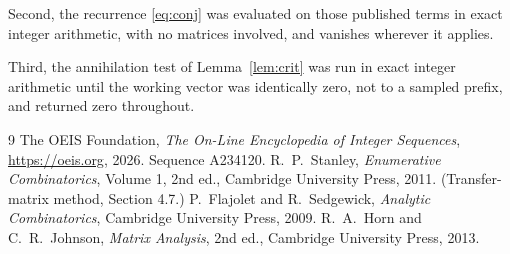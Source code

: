 \documentclass[11pt,a4paper]{article}
\theoremstyle{plain}
\theoremstyle{definition}
\begin{document}
Second, the recurrence \eqref{eq:conj} was evaluated on those published terms in exact
integer arithmetic, with no matrices involved, and vanishes wherever it applies.

Third, the annihilation test of Lemma~\ref{lem:crit} was run in exact integer arithmetic
until the working vector was identically zero, not to a sampled prefix, and returned zero
throughout.

\begin{thebibliography}{9}
 The OEIS Foundation, \emph{The On-Line Encyclopedia of Integer
Sequences}, \url{https://oeis.org}, 2026. Sequence A234120.
 R.~P.~Stanley, \emph{Enumerative Combinatorics}, Volume 1, 2nd ed.,
Cambridge University Press, 2011. (Transfer-matrix method, Section 4.7.)
 P.~Flajolet and R.~Sedgewick, \emph{Analytic Combinatorics}, Cambridge
University Press, 2009.
 R.~A.~Horn and C.~R.~Johnson, \emph{Matrix Analysis}, 2nd ed., Cambridge
University Press, 2013.
\end{thebibliography}
\end{document}
